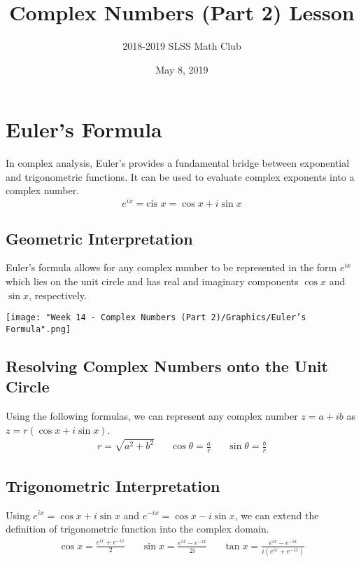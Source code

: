 \documentclass[12pt]{article}
\title{Complex Numbers (Part 2) Lesson\vspace{-3mm}}
\author{2018-2019 SLSS Math Club\vspace{-5mm}}
\date{May 8, 2019\vspace{-5mm}}
\begin{document}
\maketitle

\section{Euler's Formula}
In complex analysis, Euler's provides a fundamental bridge between exponential and trigonometric functions. It can be used to evaluate complex exponents into a complex number.
\begin{equation*}
    e^{ix} = \text{cis } x = \cos{x} + i\sin{x}
\end{equation*}

\subsection{Geometric Interpretation}
Euler's formula allows for any complex number to be represented in the form $e^{ix}$ which lies on the unit circle and has real and imaginary components $\cos{x}$ and $\sin{x}$, respectively.

\begin{center}
    \texttt{[image: "Week 14 - Complex Numbers (Part 2)/Graphics/Euler's Formula".png]}
\end{center}

\subsection{Resolving Complex Numbers onto the Unit Circle}
Using the following formulas, we can represent any complex number $z = a + ib$ as $z = r(\cos{x} + i\sin{x})$.
\begin{align*}
    r = \sqrt{a^2 + b^2} && \cos{\theta} = \frac{a}{r} && \sin{\theta} = \frac{b}{r}
\end{align*}

\subsection{Trigonometric Interpretation}
Using $e^{ix} =  \cos{x} + i\sin{x}$ and $e^{-ix} =  \cos{x} - i\sin{x}$, we can extend the definition of trigonometric function into the complex domain.
\begin{align*}
    \cos{x} = \frac{e^{ix} +e^{-ix}}{2} && \sin{x} = \frac{e^{ix} - e^{-ix}}{2i} && \tan{x} = \frac{e^{ix} - e^{-ix}}{i(e^{ix} +e^{-ix})}
\end{align*}
\end{document}
